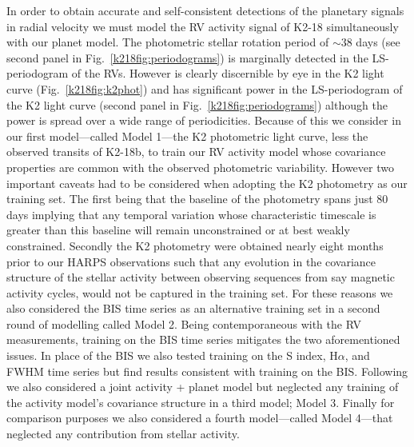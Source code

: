 In order to obtain accurate and self-consistent detections of the planetary signals in radial velocity
we must model the RV activity signal of K2-18 simultaneously with our planet model. The  
photometric stellar rotation period of $\sim 38$ days (see second panel in Fig.~\ref{k218fig:periodograms}) is
marginally detected in the LS-periodogram of the RVs. However \prot{} is clearly discernible by eye in the
K2 light curve (Fig.~\ref{k218fig:k2phot}) and has significant power in the LS-periodogram of the K2 light curve
(second panel in Fig.~\ref{k218fig:periodograms}) although the power is spread over a wide range of periodicities.
Because of this we consider in our first model---called Model 1---the
K2 photometric light curve, less the observed transits of K2-18b, to train our RV activity model whose covariance
properties are common with the observed photometric variability. However two important caveats had to be considered when adopting
the K2 photometry as our training set. The first being that the baseline of the photometry spans just 80 days
implying that any temporal variation whose characteristic timescale is greater than this baseline will
remain unconstrained or at best weakly constrained. Secondly the K2 photometry were obtained nearly eight
months prior to our HARPS observations such that any evolution in the covariance structure of the stellar
activity between
observing sequences from say magnetic activity cycles, would not be captured in the training set. For these
reasons we also considered the BIS time series as an alternative training set in a
second round of modelling called Model 2.
Being contemporaneous with the RV measurements, training on the BIS time series mitigates the two
aforementioned issues. In place of the BIS we also tested training on the S index, H$\alpha$, and
FWHM time series but find results consistent with training on the BIS. Following \cite{faria16} we also
considered a joint activity + planet model but neglected any training of the activity model's covariance structure in
a third model; Model 3. Finally for comparison
purposes we also considered a fourth model---called Model 4---that neglected any contribution from stellar
activity.

